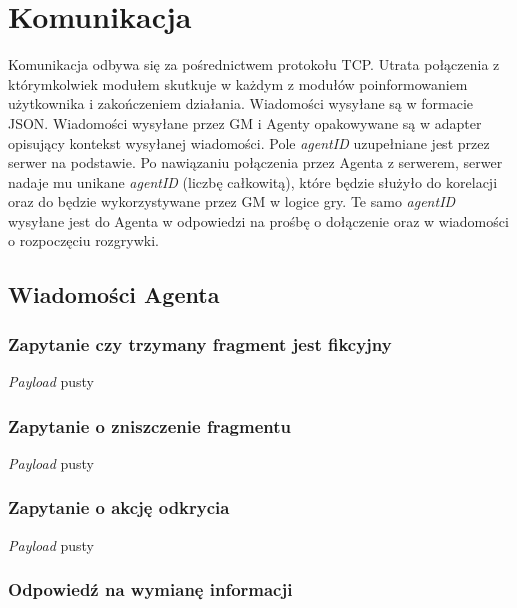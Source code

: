 \documentclass[Dokumentacja.tex]{subfiles}
\begin{document}
\section{Komunikacja}
Komunikacja odbywa się za pośrednictwem protokołu TCP. Utrata połączenia z którymkolwiek modułem skutkuje w każdym z modułów
poinformowaniem użytkownika i zakończeniem działania. Wiadomości wysyłane są w formacie JSON.
Wiadomości wysyłane przez GM i Agenty opakowywane są w adapter opisujący kontekst wysyłanej wiadomości.
Pole \textit{agentID} uzupełniane jest przez serwer na podstawie. Po nawiązaniu połączenia przez Agenta z serwerem,
serwer nadaje mu unikane \textit{agentID} (liczbę całkowitą), które będzie służyło do korelacji oraz do będzie
wykorzystywane przez GM w logice gry. Te samo \textit{agentID} wysyłane jest do Agenta w odpowiedzi na prośbę o dołączenie
oraz w wiadomości o rozpoczęciu rozgrywki.



\subsection{Wiadomości Agenta}
\subsubsection{Zapytanie czy trzymany fragment jest fikcyjny}
\textit{Payload} pusty


\subsubsection{Zapytanie o zniszczenie fragmentu}
\textit{Payload} pusty


\subsubsection{Zapytanie o akcję odkrycia}
\textit{Payload} pusty


\subsubsection{Odpowiedź na wymianę informacji}

\end{document}
